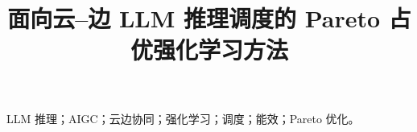 \documentclass[conference]{IEEEtran}
\title{面向云--边 LLM 推理调度的 Pareto 占优强化学习方法}
\author{
  \IEEEauthorblockN{李卓伦}
  \IEEEauthorblockA{布里斯托大学 理工学院，英国布里斯托\\
                    邮箱：nu25406@bristol.ac.uk}
}
\begin{document}
\maketitle



\begin{IEEEkeywords}
LLM 推理；AIGC；云边协同；强化学习；调度；能效；Pareto 优化。
\end{IEEEkeywords}












\end{document}
